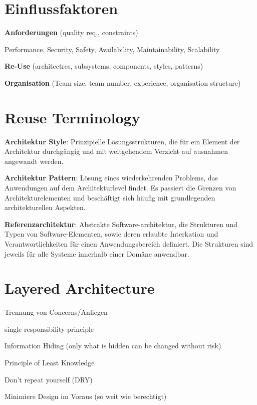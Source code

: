\section{Einflussfaktoren}
\begin{compactitem}
    \item \textbf{Anforderungen} (quality req., constraints)
    \begin{compactitem}
        \item Performance, Security, Safety, Availability, Maintainability,
        Scalability
    \end{compactitem}
    \item \textbf{Re-Use} (architectres, subsystems, components, styles, patterns)
    \item \textbf{Organisation} (Team size, team number, experience, organisation structure)
\end{compactitem}

\section{Reuse Terminology}
\begin{compactitem}
    \item \textbf{Architektur Style}: Prinzipielle Lösungsstrukturen, die für
    ein Element der Architektur durchgängig und mit weitgehendem Verzicht auf
    ausnahmen angewandt werden.
    \item \textbf{Architektur Pattern}: Lösung eines wiederkehrenden Problems, das
    Anwendungen auf dem Architekturlevel findet. Es passiert die Grenzen von
    Architekturelementen und beschäftigt sich häufig mit grundlegenden architekturellen
    Aspekten.
    \item \textbf{Referenzarchitektur}: Abstrakte Software-architektur, die Strukturen
    und Typen von Software-Elementen, sowie deren erlaubte Interkation und
    Verantwortlichkeiten für einen Anwendungsbereich definiert. Die Strukturen
    sind jeweils für alle Systeme innerhalb einer Domäne anwendbar.
\end{compactitem}

\section{Layered Architecture}
\begin{compactitem}
    \item Trennung von Concerns/Anliegen
    \item single responsibility principle
    \item Information Hiding (only what is hidden can be changed without risk)
    \item Principle of Least Knowledge
    \item Don't repeat yourself (DRY)
    \item Minimiere Design im Voraus (so weit wie berechtigt)
\end{compactitem}

